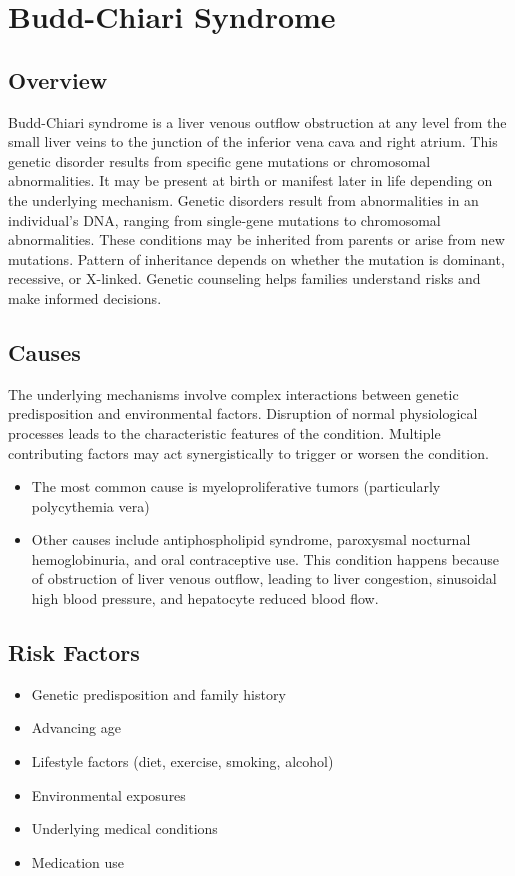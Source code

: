 \chapter{Budd-Chiari Syndrome}
\label{sec:Budd-Chiari Syndrome}

\section{Overview}
Budd-Chiari syndrome is a liver venous outflow obstruction at any level from the small liver veins to the junction of the inferior vena cava and right atrium. This genetic disorder results from specific gene mutations or chromosomal abnormalities. It may be present at birth or manifest later in life depending on the underlying mechanism. Genetic disorders result from abnormalities in an individual's DNA, ranging from single-gene mutations to chromosomal abnormalities. These conditions may be inherited from parents or arise from new mutations. Pattern of inheritance depends on whether the mutation is dominant, recessive, or X-linked. Genetic counseling helps families understand risks and make informed decisions.
\section{Causes}
The underlying mechanisms involve complex interactions between genetic predisposition and environmental factors. Disruption of normal physiological processes leads to the characteristic features of the condition. Multiple contributing factors may act synergistically to trigger or worsen the condition.

\begin{itemize}[noitemsep]
  \item The most common cause is myeloproliferative tumors (particularly polycythemia vera)
  \item Other causes include antiphospholipid syndrome, paroxysmal nocturnal hemoglobinuria, and oral contraceptive use. This condition happens because of obstruction of liver venous outflow, leading to liver congestion, sinusoidal high blood pressure, and hepatocyte reduced blood flow.
\end{itemize}
\section{Risk Factors}


\begin{itemize}[noitemsep]
  \item Genetic predisposition and family history
  \item Advancing age
  \item Lifestyle factors (diet, exercise, smoking, alcohol)
  \item Environmental exposures
  \item Underlying medical conditions
  \item Medication use
\end{itemize}
